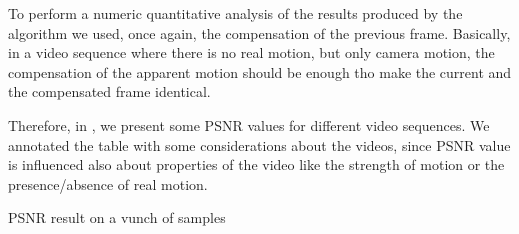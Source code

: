 To perform a numeric quantitative analysis of the results produced by the algorithm we used, once again, the compensation of the previous frame. Basically, in a video sequence where there is no real motion, but only camera motion, the compensation of the apparent motion should be enough tho make the current and the compensated frame identical.

Therefore, in , we present some PSNR values for different video sequences. We annotated the table with some considerations about the videos, since PSNR value is influenced also about properties of the video like the strength of motion or the presence/absence of real motion.

\begin{table}
    \label{tab:psnr}
    
    \caption{PSNR result on a vunch of samples}
\end{table}    
